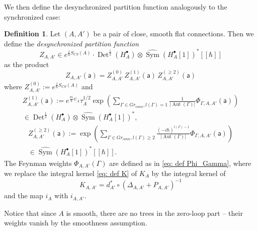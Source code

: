 \documentclass[11pt,a4paper]{amsart}
\theoremstyle{plain} %
\theoremstyle{definition}
\newtheorem{defn}[thm]{Definition}
\theoremstyle{remark}
\newcommand{\Det}{\operatorname{Det}}
\newcommand{\Sym}{\operatorname{Sym}}
\newcommand{\sfa}{\mathsf{a}}
\begin{document}
{We then define the desynchronized partition function analogously to the synchronized case: 
\begin{defn}
Let $(A,A')$ be a pair of close, smooth flat connections. Then we define the \emph{desynchronized partition function} $$Z_{A,A'} \in e^{\frac{i}{\hbar}S_{CS}(A)}\cdot \Det^\frac12 (H^\bullet_{A})\otimes\widehat{\Sym}(H^\bullet_{A}[1])^*[[\hbar]]$$ as the product 
\begin{equation}
    Z_{A,A'}(\sfa) = Z^{(0)}_{A,A'}\,Z^{(1)}_{A,A'}(\sfa)\, Z^{(\geq 2)}_{A,A'}(\sfa)   
\end{equation}
where  $Z_{A,A'}^{(0)} :=  e^{\frac{i}{\hbar}S_{CS}(A)} $ and 
\begin{multline} 
        Z_{A,A'}^{(1)}(\mathsf{a}) :=  %
        e^{\frac{\pi i}{4}\psi_{A}} \tau_{A}^{1/2}
        \exp\left(\sum_{\Gamma \in Gr_{conn}, l(\Gamma) =1 } \frac{1}{|\operatorname{Aut}(\Gamma)|}\Phi_{\Gamma,A,A'}(\mathsf{a})\right) \\
    \in  \Det^\frac12 (H^\bullet_{A})\otimes\widehat{\Sym}(H^\bullet_{A}[1])^*, \label{eq: Z desy 1-loop}
\end{multline}
\begin{multline}
    Z_{A,A'}^{(\geq 2)}(\mathsf{a}) := \exp\left(\sum_{\Gamma \in Gr_{conn}, l(\Gamma) \geq 2} \frac{(-i\hbar)^{l(\Gamma)-1}}{|\operatorname{Aut}(\Gamma)|}\Phi_{\Gamma,A,A'}(\mathsf{a})\right)\\
    \in  %
    \widehat{\Sym}(H^\bullet_{A}[1])^*[[\hbar]].
\end{multline}
The Feynman weights $\Phi_{A,A'}(\Gamma)$ are defined as in \eqref{eq: def Phi_Gamma}, where we replace the integral kernel \eqref{eq: def K} of $K_{A}$ by the integral kernel of 
\begin{equation}
    K_{A,A'} = d_{A'}^*\circ (\Delta_{A,A'} + P_{A,A'})^{-1} 
\end{equation} and the map $i_{A}$ with $i_{A,A'}$. 
\end{defn}
Notice that since $A$ is smooth, there are no trees in the zero-loop part -- their weights vanish by the smoothness assumption. 

}
\end{document}
